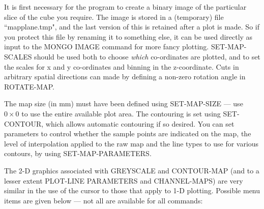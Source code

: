 \documentclass[11pt,twoside]{report}
\begin{document}
It is first necessary
for the program to create a binary image of the particular slice of the cube
you require. The image is stored in a (temporary) file ``mapplane.tmp",
 and the last version of this is retained after a plot is
made. So if you protect this file by renaming it to something else, it can be
used directly as input to the MONGO  IMAGE command
for more fancy plotting. SET-MAP-SCALES should be used both to choose {\em
which} co-ordinates are plotted, and to set the scales for x and y co-ordinates
 and binning in the z-coordinate.  Cuts in arbitrary spatial directions can made by defining a
non-zero rotation angle in ROTATE-MAP.

The map size  (in mm) must have been defined using SET-MAP-SIZE
--- use $0 \times 0$ to use the entire available plot area. The contouring is
set using SET-CONTOUR, which allows automatic contouring
 if so desired. You can set parameters to control
whether the sample points are indicated on the map, the level of interpolation
 applied to the raw map and the line types to use for
 various contours, by using SET-MAP-PARAMETERS.

The 2-D graphics associated with GREYSCALE and CONTOUR-MAP (and to a lesser
extent PLOT-LINE PARAMETERS and CHANNEL-MAPS) are very similar in the use of
the cursor  to those that apply to 1-D
plotting. Possible menu items are given below --- not all are available for all
commands:
\end{document}
